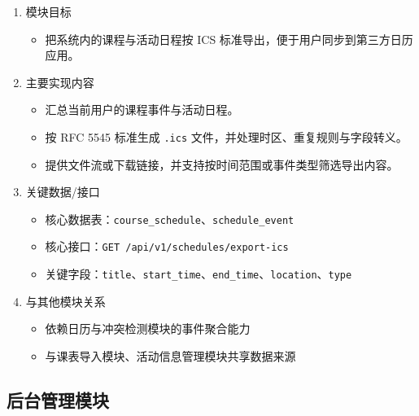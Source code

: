 \documentclass[UTF8,a4paper,12pt,fontset=none]{ctexrep}
\providecommand{\tightlist}{}
\begin{document}
\begin{enumerate}
\def\labelenumi{\arabic{enumi}.}
\item
  模块目标

  \begin{itemize}
  \tightlist
  \item
    把系统内的课程与活动日程按 ICS 标准导出，便于用户同步到第三方日历应用。
  \end{itemize}
\item
  主要实现内容

  \begin{itemize}
  \tightlist
  \item
    汇总当前用户的课程事件与活动日程。
  \item
    按 RFC 5545 标准生成 \texttt{.ics} 文件，并处理时区、重复规则与字段转义。
  \item
    提供文件流或下载链接，并支持按时间范围或事件类型筛选导出内容。
  \end{itemize}
\item
  关键数据/接口

  \begin{itemize}
  \tightlist
  \item
    核心数据表：\texttt{course\_schedule}、\texttt{schedule\_event}
  \item
    核心接口：\texttt{GET\ /api/v1/schedules/export-ics}
  \item
    关键字段：\texttt{title}、\texttt{start\_time}、\texttt{end\_time}、\texttt{location}、\texttt{type}
  \end{itemize}
\item
  与其他模块关系

  \begin{itemize}
  \tightlist
  \item
    依赖日历与冲突检测模块的事件聚合能力
  \item
    与课表导入模块、活动信息管理模块共享数据来源
  \end{itemize}
\end{enumerate}

\subsection{后台管理模块}\label{ux540eux53f0ux7ba1ux7406ux6a21ux5757}
\end{document}
